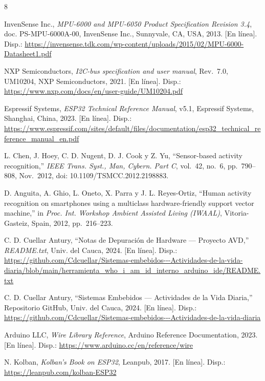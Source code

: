 \documentclass[10pt,twocolumn,a4paper]{article}
\begin{document}
\begin{thebibliography}{8}

InvenSense Inc., \textit{MPU-6000 and MPU-6050 Product Specification
Revision 3.4}, doc. PS-MPU-6000A-00, InvenSense Inc., Sunnyvale,
CA, USA, 2013. [En línea]. Disp.:
\url{https://invensense.tdk.com/wp-content/uploads/2015/02/MPU-6000-Datasheet1.pdf}

NXP Semiconductors, \textit{I2C-bus specification and user manual},
Rev.~7.0, UM10204, NXP Semiconductors, 2021. [En línea]. Disp.:
\url{https://www.nxp.com/docs/en/user-guide/UM10204.pdf}

Espressif Systems, \textit{ESP32 Technical Reference Manual}, v5.1,
Espressif Systems, Shanghai, China, 2023. [En línea]. Disp.:
\url{https://www.espressif.com/sites/default/files/documentation/esp32_technical_reference_manual_en.pdf}

L. Chen, J. Hoey, C. D. Nugent, D. J. Cook y Z. Yu,
``Sensor-based activity recognition,'' \textit{IEEE Trans. Syst.,
Man, Cybern. Part C}, vol.~42, no.~6, pp.~790--808, Nov.~2012,
doi: 10.1109/TSMCC.2012.2198883.

D. Anguita, A. Ghio, L. Oneto, X. Parra y J. L. Reyes-Ortiz,
``Human activity recognition on smartphones using a multiclass
hardware-friendly support vector machine,'' in \textit{Proc. Int.
Workshop Ambient Assisted Living (IWAAL)}, Vitoria-Gasteiz, Spain,
2012, pp.~216--223.

C. D. Cuellar Antury, ``Notas de Depuración de Hardware — Proyecto
AVD,'' \textit{README.txt}, Univ. del Cauca, 2024. [En línea]. Disp.:
\url{https://github.com/Cdcuellar/Sistemas-embebidos---Actividades-de-la-vida-diaria/blob/main/herramienta_who_i_am_id_interno_arduino_ide/README.txt}

C. D. Cuellar Antury, ``Sistemas Embebidos — Actividades de la Vida
Diaria,'' Repositorio GitHub, Univ. del Cauca, 2024. [En línea].
Disp.: \url{https://github.com/Cdcuellar/Sistemas-embebidos---Actividades-de-la-vida-diaria}

Arduino LLC, \textit{Wire Library Reference}, Arduino Reference
Documentation, 2023. [En línea]. Disp.:
\url{https://www.arduino.cc/en/reference/wire}

N. Kolban, \textit{Kolban's Book on ESP32}, Leanpub, 2017. [En línea].
Disp.: \url{https://leanpub.com/kolban-ESP32}

\end{thebibliography}
\end{document}
